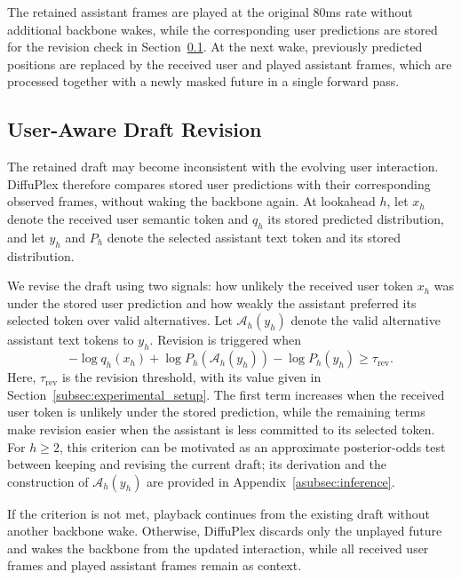 The retained assistant frames are played at the original 80ms rate without additional backbone wakes, while the corresponding user predictions are stored for the revision check in Section~\ref{subsec:user_aware_revision}.
At the next wake, previously predicted positions are replaced by the received user and played assistant frames, which are processed together with a newly masked future in a single forward pass.

\subsection{User-Aware Draft Revision}
\label{subsec:user_aware_revision}

The retained draft may become inconsistent with the evolving user interaction.
DiffuPlex therefore compares stored user predictions with their corresponding observed frames,
without waking the backbone again.
At lookahead $h$, let $x_h$ denote the received user semantic token and $q_h$ its stored predicted distribution, and let $y_h$ and $P_h$ denote the selected assistant text token and its stored distribution.

We revise the draft using two signals: how unlikely the received user token $x_h$ was under the stored user prediction and how weakly the assistant preferred its selected token over valid alternatives.
Let $\mathcal{A}_h(y_h)$ denote the valid alternative assistant text tokens to $y_h$.
Revision is triggered when
\begin{equation}
-\log q_h(x_h)
+\log P_h(\mathcal{A}_h(y_h))
-\log P_h(y_h)
\geq \tau_{\mathrm{rev}}.
\label{eq:revision}
\end{equation}
Here, $\tau_{\mathrm{rev}}$ is the revision threshold, with its value given in Section~\ref{subsec:experimental_setup}.
The first term increases when the received user token is unlikely under the stored prediction, while the remaining terms make revision easier when the assistant is less committed to its selected token.
For $h\geq2$, this criterion can be motivated as an approximate posterior-odds test between
keeping and revising the current draft; its derivation and the construction of $\mathcal{A}_h(y_h)$ are provided in Appendix~\ref{asubsec:inference}.

If the criterion is not met, playback continues from the existing draft without another backbone wake.
Otherwise, DiffuPlex discards only the unplayed future and wakes the backbone from the updated interaction, while all received user frames and played assistant frames remain as context.
